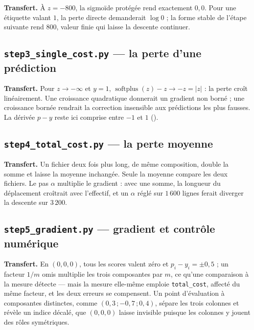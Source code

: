 
\textbf{Transfert.} À $z=-800$, la sigmoïde protégée rend exactement $0{,}0$.
Pour une étiquette valant $1$, la perte directe demanderait $\log 0$ ; la forme
stable de l'étape suivante rend $800$, valeur finie qui laisse la descente
continuer.

\subsection*{\texttt{step3\_single\_cost.py} --- la perte d'une prédiction}


\textbf{Transfert.} Pour $z\to-\infty$ et $y=1$,
$\operatorname{softplus}(z)-z\to-z=|z|$ : la perte croît linéairement. Une
croissance quadratique donnerait un gradient non borné ; une croissance bornée
rendrait la correction insensible aux prédictions les plus fausses. La dérivée
$p-y$ reste ici comprise entre $-1$ et $1$ ().

\subsection*{\texttt{step4\_total\_cost.py} --- la perte moyenne}


\textbf{Transfert.} Un fichier deux fois plus long, de même composition, double
la somme et laisse la moyenne inchangée. Seule la moyenne compare les deux
fichiers. Le pas $\alpha$ multiplie le gradient : avec une somme, la longueur du
déplacement croîtrait avec l'effectif, et un $\alpha$ réglé sur $1\,600$ lignes
ferait diverger la descente sur $3\,200$.

\subsection*{\texttt{step5\_gradient.py} --- gradient et contrôle numérique}


\textbf{Transfert.} En $(0,0,0)$, tous les scores valent zéro et
$p_i-y_i=\pm0{,}5$ ; un facteur $1/m$ omis multiplie les trois composantes par
$m$, ce qu'une comparaison à la mesure détecte --- mais la mesure elle-même
emploie \texttt{total\_cost}, affecté du même facteur, et les deux erreurs se
compensent. Un point d'évaluation à composantes distinctes, comme
$(0{,}3\,;-0{,}7\,;0{,}4)$, sépare les trois colonnes et révèle un indice
décalé, que $(0,0,0)$ laisse invisible puisque les colonnes y jouent des rôles
symétriques.

